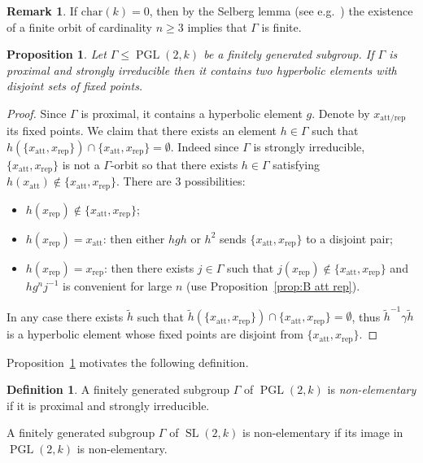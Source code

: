 \documentclass[11pt]{article}
\newtheorem{prop}[theo]{Proposition}
\theoremstyle{definition}
\newtheorem{defi}[theo]{Definition}
\newtheorem{rema}[theo]{Remark}
\numberwithin{equation}{section}
\numberwithin{figure}{section}
\numberwithin{table}{section}
\DeclareMathOperator{\SL}{SL}
\DeclareMathOperator{\PGL}{PGL}
\newcommand{\att}{\mathrm{att}}
\newcommand{\rep}{\mathrm{rep}}
\newcommand{\PGLk}{\PGL(2, k)}
\newcommand{\inv}{^{-1}}
\begin{document}
\begin{rema}
If $\mathrm{char}(k) = 0$, then by the Selberg lemma (see e.g.~\cite{alperin}) the existence of a finite orbit of cardinality $n\geq 3$ implies that $\Gamma$ is finite.
\end{rema}



\begin{prop}\label{prop:non elementary}
Let $\Gamma\leq \PGLk$ be a finitely generated subgroup. If $\Gamma$ is proximal and strongly irreducible then it contains two hyperbolic elements with disjoint sets of fixed points.
\end{prop}

\begin{proof}
Since $\Gamma$ is proximal, it contains a hyperbolic element $g$. Denote by $x_{\att/\rep}$ its fixed points. We claim that there exists an element $h \in \Gamma$ such that $h(\{ x_\att, x_\rep\}) \cap\{ x_\att, x_\rep\}= \emptyset$. Indeed since $\Gamma$ is strongly irreducible, $\{ x_\att, x_\rep\}$ is not a $\Gamma$-orbit so that there exists $h\in \Gamma$ satisfying $h(x_\att) \notin \{ x_\att, x_\rep\}$. There are 3 possibilities:
\begin{itemize}
\item $h(x_\rep)\notin \{ x_\att, x_\rep\}$;
\item $h(x_\rep) = x_\att$: then either $hgh$ or $h^2$ sends $\{ x_\att, x_\rep\}$ to a disjoint pair;
\item $h(x_\rep) = x_\rep$: then there exists $j\in \Gamma$ such that $j(x_\rep)\notin \{ x_\att, x_\rep\}$ and $hg^nj\inv$ is convenient for large $n$ (use Proposition~\ref{prop:B att rep}).
\end{itemize}
In any case there exists $\tilde{h}$ such that $\tilde{h}(\{ x_\att, x_\rep\})\cap \{ x_\att, x_\rep\}=\emptyset$, thus $\tilde{h}^{- 1} \gamma \tilde{h}$ is a hyperbolic element whose fixed points are disjoint from $\{ x_\att, x_\rep\}$.
\end{proof}

Proposition~\ref{prop:non elementary} motivates the following definition.

\begin{defi}
A finitely generated subgroup $\Gamma$ of $\PGL(2,k)$ is \emph{non-elemen\-tary} if it is proximal and strongly irreducible.

A finitely generated subgroup $\Gamma$ of $\SL(2,k)$ is non-elementary if its image in $\PGL(2,k)$ is non-elementary.
\end{defi}
\end{document}
